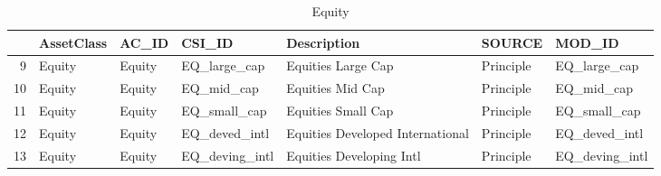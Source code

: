 \begin{longtable}{rllllll}
\caption{Equity} \\ 
  \hline
 & AssetClass & AC\_ID & CSI\_ID & Description & SOURCE & MOD\_ID \\ 
  \hline
9 & Equity & Equity & EQ\_large\_cap & Equities Large Cap & Principle & EQ\_large\_cap \\ 
  10 & Equity & Equity & EQ\_mid\_cap & Equities Mid Cap & Principle & EQ\_mid\_cap \\ 
  11 & Equity & Equity & EQ\_small\_cap & Equities Small Cap & Principle & EQ\_small\_cap \\ 
  12 & Equity & Equity & EQ\_deved\_intl & Equities Developed International & Principle & EQ\_deved\_intl \\ 
  13 & Equity & Equity & EQ\_deving\_intl & Equities Developing Intl & Principle & EQ\_deving\_intl \\ 
   \hline
\hline
\end{longtable}
